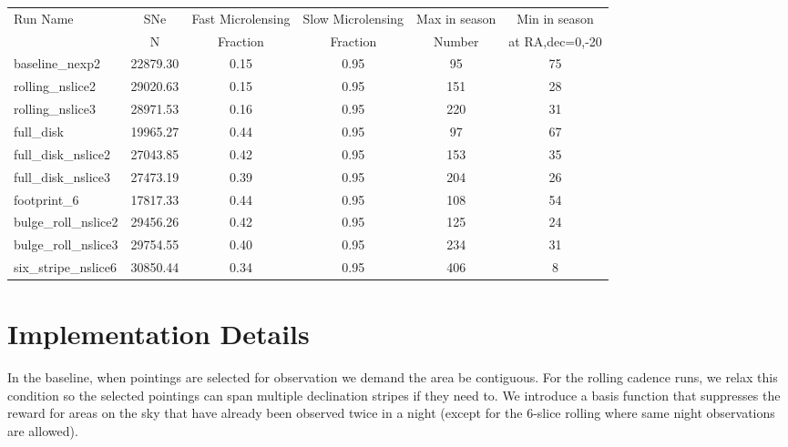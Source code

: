 \documentclass[modern]{aastex62}
\begin{document}
\begin{table}
\begin{tabular}{lccccc}\label{tab:metrics}

 Run Name &  SNe &  Fast Microlensing &  Slow Microlensing &  Max in season &  Min in season \\
 &           N    & Fraction  & Fraction     &   Number & at RA,dec=0,-20 \\
\toprule

baseline\_nexp2 &              22879.30 &                    0.15 &                    0.95 &     95 &     75 \\
rolling\_nslice2 &             29020.63 &                    0.15 &                    0.95 &    151 &     28 \\
rolling\_nslice3 &             28971.53 &                    0.16 &                    0.95 &    220 &     31 \\

\hline
full\_disk &                      19965.27 &                    0.44 &                    0.95 &     97 &     67 \\
full\_disk\_nslice2 &             27043.85 &                    0.42 &                    0.95 &    153 &     35 \\
full\_disk\_nslice3 &             27473.19 &                    0.39 &                    0.95 &    204 &     26 \\

\hline
footprint\_6 &                     17817.33 &                    0.44 &                    0.95 &    108 &     54 \\
bulge\_roll\_nslice2 &             29456.26 &                    0.42 &                    0.95 &    125 &     24 \\
bulge\_roll\_nslice3 &             29754.55 &                    0.40 &                    0.95 &    234 &     31 \\
six\_stripe\_nslice6 &             30850.44 &                    0.34 &                    0.95 &    406 &      8 \\
\hline
\end{tabular}
\end{table}


\section{Implementation Details}


In the baseline, when pointings are selected for observation we demand the area be contiguous. For the rolling cadence runs, we relax this condition so the selected pointings can span multiple declination stripes if they need to.  We introduce a basis function that suppresses the reward for areas on the sky that have already been observed twice in a night (except for the 6-slice rolling where same night observations are allowed).
\end{document}
